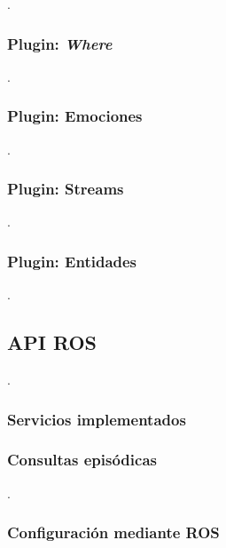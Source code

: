 .
\subsubsection{Plugin: \textit{Where}}

.
\subsubsection{Plugin: Emociones}

.
\subsubsection{Plugin: Streams}

.
\subsubsection{Plugin: Entidades}

.

\subsection{API ROS}

.

\subsubsection{Servicios implementados}



\subsubsection{Consultas episódicas}

.

\subsubsection{Configuración mediante ROS}

